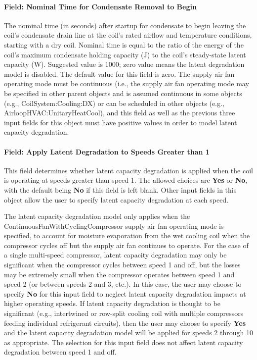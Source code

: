 \paragraph{Field: Nominal Time for Condensate Removal to Begin}

The nominal time (in seconds) after startup for condensate to begin leaving the coil's condensate drain line at the coil's rated airflow and temperature conditions, starting with a dry coil. Nominal time is equal to the ratio of the energy of the coil's maximum condensate holding capacity (J) to the coil's steady-state latent capacity (W). Suggested value is 1000; zero value means the latent degradation model is disabled. The default value for this field is zero. The supply air fan operating mode must be continuous (i.e., the supply air fan operating mode may be specified in other parent objects and is assumed continuous in some objects (e.g., CoilSystem:Cooling:DX) or can be scheduled in other objects (e.g., AirloopHVAC:UnitaryHeatCool), and this field as well as the previous three input fields for this object must have positive values in order to model latent capacity degradation.

\paragraph{Field: Apply Latent Degradation to Speeds Greater than 1}

This field determines whether latent capacity degradation is applied when the coil is operating at speeds greater than speed 1. The allowed choices are \textbf{Yes} or \textbf{No}, with the default being \textbf{No} if this field is left blank. Other input fields in this object allow the user to specify latent capacity degradation at each speed.

The latent capacity degradation model only applies when the ContinuousFanWithCyclingCompressor supply air fan operating mode is specified, to account for moisture evaporation from the wet cooling coil when the compressor cycles off but the supply air fan continues to operate. For the case of a single multi-speed compressor, latent capacity degradation may only be significant when the compressor cycles between speed 1 and off, but the losses may be extremely small when the compressor operates between speed 1 and speed 2 (or between speeds 2 and 3, etc.). In this case, the user may choose to specify \textbf{No} for this input field to neglect latent capacity degradation impacts at higher operating speeds. If latent capacity degradation is thought to be significant (e.g., intertwined or row-split cooling coil with multiple compressors feeding individual refrigerant circuits), then the user may choose to specify \textbf{Yes} and the latent capacity degradation model will be applied for speeds 2 through 10 as appropriate. The selection for this input field does not affect latent capacity degradation between speed 1 and off.

